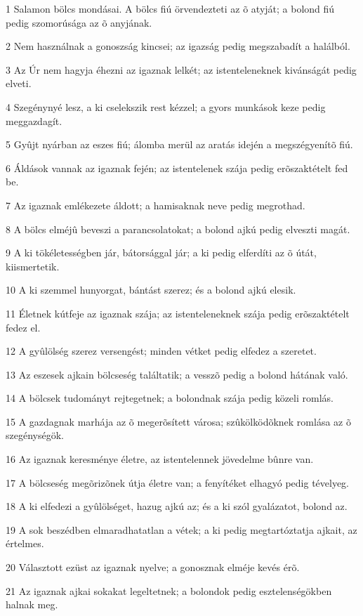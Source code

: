 \par 1 Salamon bölcs mondásai. A bölcs fiú örvendezteti az õ atyját; a bolond fiú pedig szomorúsága az õ anyjának.
\par 2 Nem használnak a gonoszság kincsei; az igazság pedig  megszabadít a halálból.
\par 3 Az Úr nem hagyja éhezni az igaznak lelkét; az istenteleneknek kivánságát pedig elveti.
\par 4 Szegénynyé lesz, a ki cselekszik rest kézzel; a gyors munkások keze pedig meggazdagít.
\par 5 Gyûjt nyárban az eszes fiú; álomba merül az aratás idején a megszégyenítõ fiú.
\par 6 Áldások vannak az igaznak fején; az istentelenek szája pedig erõszaktételt fed be.
\par 7 Az igaznak emlékezete áldott; a hamisaknak neve pedig megrothad.
\par 8 A bölcs elméjû beveszi a parancsolatokat; a bolond ajkú pedig elveszti magát.
\par 9 A ki tökéletességben jár, bátorsággal jár; a ki pedig elferdíti az õ útát, kiismertetik.
\par 10 A ki szemmel hunyorgat, bántást szerez; és a bolond ajkú elesik.
\par 11 Életnek kútfeje az igaznak szája; az istenteleneknek szája pedig erõszaktételt fedez el.
\par 12 A gyûlölség szerez versengést; minden vétket pedig elfedez a szeretet.
\par 13 Az eszesek ajkain bölcseség találtatik; a vesszõ pedig a bolond hátának való.
\par 14 A bölcsek tudományt rejtegetnek; a bolondnak szája pedig közeli romlás.
\par 15 A gazdagnak marhája az õ megerõsített városa; szûkölködõknek romlása az õ szegénységök.
\par 16 Az igaznak keresménye életre, az istentelennek jövedelme bûnre van.
\par 17 A bölcseség megõrizõnek útja életre van; a fenyítéket elhagyó pedig tévelyeg.
\par 18 A ki elfedezi a gyûlölséget, hazug ajkú az; és a ki szól gyalázatot, bolond az.
\par 19 A sok beszédben elmaradhatatlan a vétek; a ki pedig megtartóztatja ajkait, az értelmes.
\par 20 Választott ezüst az igaznak nyelve; a gonosznak elméje kevés érõ.
\par 21 Az igaznak ajkai sokakat legeltetnek; a bolondok pedig esztelenségökben halnak meg.
